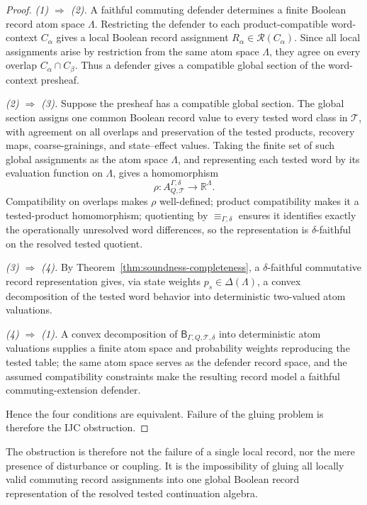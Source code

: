\documentclass[11pt]{article}
\newcommand{\R}{\mathbb R}
\begin{document}
\begin{proof}
\emph{(1) $\Rightarrow$ (2).}  A faithful commuting defender
determines a finite Boolean record atom space $\Lambda$.  Restricting
the defender to each product-compatible word-context $C_\alpha$ gives
a local Boolean record assignment $R_\alpha\in\mathcal R(C_\alpha)$.
Since all local assignments arise by restriction from the same atom
space $\Lambda$, they agree on every overlap $C_\alpha\cap C_\beta$.
Thus a defender gives a compatible global section of the
word-context presheaf.

\emph{(2) $\Rightarrow$ (3).}  Suppose the presheaf has a compatible
global section.  The global section assigns one common Boolean record
value to every tested word class in $\mathcal T$, with agreement on
all overlaps and preservation of the tested products, recovery maps,
coarse-grainings, and state--effect values.  Taking the finite set of
such global assignments as the atom space $\Lambda$, and representing
each tested word by its evaluation function on $\Lambda$, gives a
homomorphism
\[
    \rho:A^{\Gamma,\delta}_{Q,\mathcal T}\longrightarrow\R^\Lambda.
\]
Compatibility on overlaps makes $\rho$ well-defined; product
compatibility makes it a tested-product homomorphism; quotienting by
$\equiv_{\Gamma,\delta}$ ensures it identifies exactly the
operationally unresolved word differences, so the representation is
$\delta$-faithful on the resolved tested quotient.

\emph{(3) $\Rightarrow$ (4).}  By
Theorem~\ref{thm:soundness-completeness}, a $\delta$-faithful
commutative record representation gives, via state weights
$p_s\in\Delta(\Lambda)$, a convex decomposition of the tested word
behavior into deterministic two-valued atom valuations.

\emph{(4) $\Rightarrow$ (1).}  A convex decomposition of
$\mathsf B_{\Gamma,Q,\mathcal T,\delta}$ into deterministic atom
valuations supplies a finite atom space and probability weights
reproducing the tested table; the same atom space serves as the
defender record space, and the assumed compatibility constraints make
the resulting record model a faithful commuting-extension defender.

Hence the four conditions are equivalent.  Failure of the gluing
problem is therefore the IJC obstruction.
\end{proof}

The obstruction is therefore not the failure of a single local
record, nor the mere presence of disturbance or coupling.  It is the
impossibility of gluing all locally valid commuting record
assignments into one global Boolean record representation of the
resolved tested continuation algebra.
\end{document}
